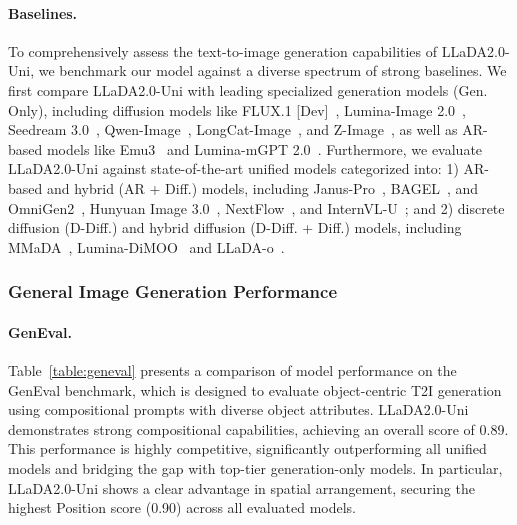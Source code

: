 \paragraph{Baselines.} To comprehensively assess the text-to-image generation capabilities of LLaDA2.0-Uni, we benchmark our model against a diverse spectrum of strong baselines.
%
We first compare LLaDA2.0-Uni with leading specialized generation models (Gen. Only), including diffusion models like FLUX.1 [Dev]~\citep{flux}, Lumina-Image 2.0~\citep{qin2025lumina}, Seedream 3.0~\citep{gao2025seedream}, Qwen-Image~\citep{wu2025qwen}, LongCat-Image~\citep{team2025longcat}, and Z-Image~\citep{cai2025z}, as well as AR-based models like Emu3~\citep{wang2024emu3} and Lumina-mGPT 2.0~\citep{xin2025lumina}.
%
Furthermore, we evaluate LLaDA2.0-Uni against state-of-the-art unified models categorized into: 
%
1) AR-based and hybrid (AR + Diff.) models, including Janus-Pro~\citep{Janus}, BAGEL~\citep{bagel}, and OmniGen2~\citep{wu2025omnigen2}, Hunyuan Image 3.0~\citep{cao2025hunyuanimage}, NextFlow~\citep{zhang2026nextflow}, and InternVL-U~\citep{tian2026internvl}; 
%
and 2) discrete diffusion (D-Diff.) and hybrid diffusion (D-Diff. + Diff.) models, including MMaDA~\citep{Mmada}, Lumina-DiMOO~\citep{dimoo} and LLaDA-o~\citep{you2026lladao}.














\subsubsection{General Image Generation Performance}
\paragraph{GenEval.} Table~\ref{table:geneval} presents a comparison of model performance on the GenEval benchmark, which is designed to evaluate object-centric T2I generation using compositional prompts with diverse object attributes. 
%
LLaDA2.0-Uni demonstrates strong compositional capabilities, achieving an overall score of 0.89.
%
This performance is highly competitive, significantly outperforming all unified models and bridging the gap with top-tier generation-only models.
%
In particular, LLaDA2.0-Uni shows a clear advantage in spatial arrangement, securing the highest Position score (0.90) across all evaluated models.




